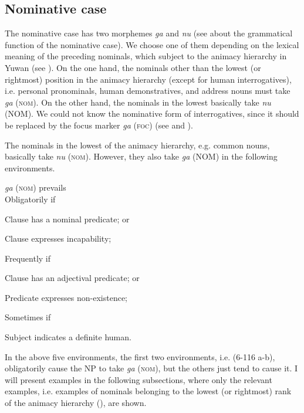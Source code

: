 \subsection{Nominative case}

The nominative case has two morphemes \textit{ga} and \textit{nu} (see  about the grammatical function of the nominative case). We choose one of them depending on the lexical meaning of the preceding nominals, which subject to the animacy hierarchy in Yuwan (see ). On the one hand, the nominals other than the lowest (or rightmost) position in the animacy hierarchy (except for human interrogatives), i.e. personal pronominals, human demonstratives, and address nouns must take \textit{ga} (\textsc{nom}). On the other hand, the nominals in the lowest basically take \textit{nu} (NOM). We could not know the nominative form of interrogatives, since it should be replaced by the focus marker \textit{ga} (\textsc{foc}) (see  and ).

The nominals in the lowest of the animacy hierarchy, e.g. common nouns, basically take \textit{nu} (\textsc{nom}). However, they also take \textit{ga} (NOM) in the following environments.

\ea\label{ex:6-116}
 \textit{ga} (\textsc{nom}) prevails\\

  Obligatorily if

 \ea Clause has a nominal predicate; or\\
\gll

 \ex Clause expresses incapability;\\
\gll

  Frequently if

 \ex Clause has an adjectival predicate; or\\
\gll

 \ex Predicate expresses non-existence;\\
\gll

  Sometimes if

 \ex Subject indicates a definite human.\\
\gll

In the above five environments, the first two environments, i.e. (6-116 a-b), obligatorily cause the NP to take \textit{ga} (\textsc{nom}), but the others just tend to cause it. I will present examples in the following subsections, where only the relevant examples, i.e. examples of nominals belonging to the lowest (or rightmost) rank of the animacy hierarchy (), are shown.

